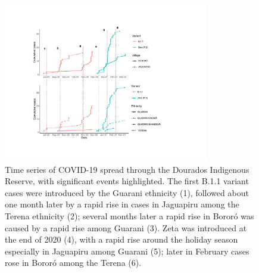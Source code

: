 \documentclass[
  letterpaper,
  abstract]{scrartcl}
\begin{document}
\begin{figure}[H]
\caption{Time series of COVID-19 spread through the Dourados Indigenous
Reserve, with significant events highlighted. The first B.1.1 variant
cases were introduced by the Guarani ethnicity (1), followed about one
month later by a rapid rise in cases in Jaguapiru among the Terena
ethnicity (2); several months later a rapid rise in Bororó was caused by
a rapid rise among Guarani (3). Zeta was introduced at the end of 2020
(4), with a rapid rise around the holiday season especially in Jaguapiru
among Guarani (5); later in February cases rose in Bororó among the
Terena (6).}
\label{fig:DeOliveiraSeries}
\vspace{0.3em}
{\centering \includegraphics[width=0.8\textwidth,height=\textheight]{Figures/Time Series.pdf}

}
\end{figure}%
\end{document}
